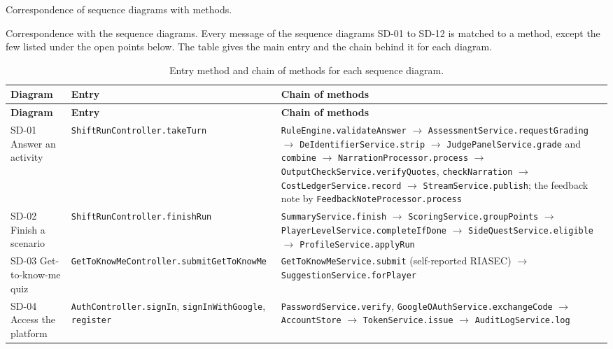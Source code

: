 Correspondence of sequence diagrams with methods.

Correspondence with the sequence diagrams. Every message of the sequence diagrams SD-01 to SD-12 is matched to a method, except the few listed under the open points below. The table gives the main entry and the chain behind it for each diagram.

{\small
\begin{longtable}{|>{\raggedright\arraybackslash}p{}|>{\raggedright\arraybackslash}p{}|>{\raggedright\arraybackslash}p{}|}
\caption{Entry method and chain of methods for each sequence diagram.} \\
\hline
\textbf{Diagram} & \textbf{Entry} & \textbf{Chain of methods} \\ \hline
\endfirsthead
\hline
\textbf{Diagram} & \textbf{Entry} & \textbf{Chain of methods} \\ \hline
\endhead
SD-01 Answer an activity & \texttt{ShiftRunController.\allowbreak{}takeTurn} & \texttt{RuleEngine.\allowbreak{}validateAnswer} $\rightarrow$ \texttt{AssessmentService.\allowbreak{}requestGrading} $\rightarrow$ \texttt{DeIdentifierService.\allowbreak{}strip} $\rightarrow$ \texttt{JudgePanelService.\allowbreak{}grade} and \texttt{combine} $\rightarrow$ \texttt{NarrationProcessor.\allowbreak{}process} $\rightarrow$ \texttt{OutputCheckService.\allowbreak{}verifyQuotes}, \texttt{checkNarration} $\rightarrow$ \texttt{CostLedgerService.\allowbreak{}record} $\rightarrow$ \texttt{StreamService.\allowbreak{}publish}; the feedback note by \texttt{FeedbackNoteProcessor.\allowbreak{}process} \\ \hline
SD-02 Finish a scenario & \texttt{ShiftRunController.\allowbreak{}finishRun} & \texttt{SummaryService.\allowbreak{}finish} $\rightarrow$ \texttt{ScoringService.\allowbreak{}groupPoints} $\rightarrow$ \texttt{PlayerLevelService.\allowbreak{}completeIfDone} $\rightarrow$ \texttt{SideQuestService.\allowbreak{}eligible} $\rightarrow$ \texttt{ProfileService.\allowbreak{}applyRun} \\ \hline
SD-03 Get-\allowbreak{}to-\allowbreak{}know-\allowbreak{}me quiz & \texttt{GetToKnowMeController.\allowbreak{}submitGetToKnowMe} & \texttt{GetToKnowMeService.\allowbreak{}submit} (self-\allowbreak{}reported RIASEC) $\rightarrow$ \texttt{SuggestionService.\allowbreak{}forPlayer} \\ \hline
SD-04 Access the platform & \texttt{AuthController.\allowbreak{}signIn}, \texttt{signInWithGoogle}, \texttt{register} & \texttt{PasswordService.\allowbreak{}verify}, \texttt{GoogleOAuthService.\allowbreak{}exchangeCode} $\rightarrow$ \texttt{AccountStore} $\rightarrow$ \texttt{TokenService.\allowbreak{}issue} $\rightarrow$ \texttt{AuditLogService.\allowbreak{}log} \\ \hline

\end{longtable}}
